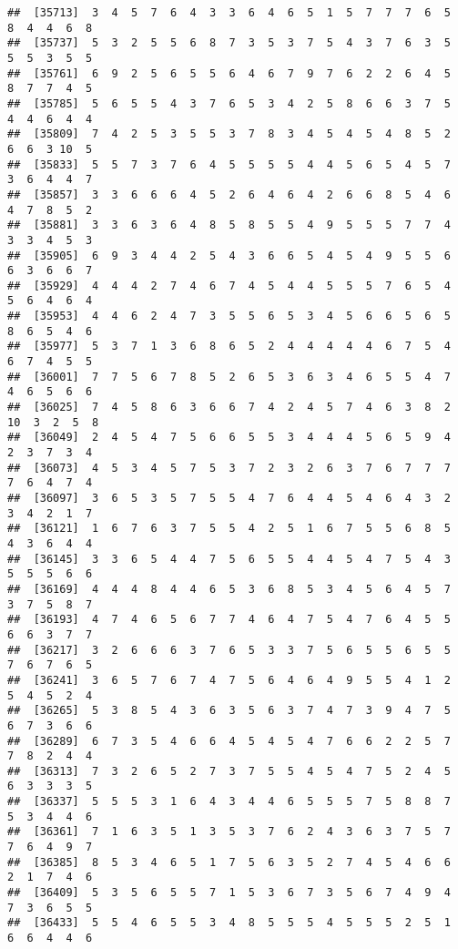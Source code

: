 \documentclass[
]{book}
\begin{document}
\begin{verbatim}
##  [35713]  3  4  5  7  6  4  3  3  6  4  6  5  1  5  7  7  7  6  5  8  4  4  6  8
##  [35737]  5  3  2  5  5  6  8  7  3  5  3  7  5  4  3  7  6  3  5  5  5  3  5  5
##  [35761]  6  9  2  5  6  5  5  6  4  6  7  9  7  6  2  2  6  4  5  8  7  7  4  5
##  [35785]  5  6  5  5  4  3  7  6  5  3  4  2  5  8  6  6  3  7  5  4  4  6  4  4
##  [35809]  7  4  2  5  3  5  5  3  7  8  3  4  5  4  5  4  8  5  2  6  6  3 10  5
##  [35833]  5  5  7  3  7  6  4  5  5  5  5  4  4  5  6  5  4  5  7  3  6  4  4  7
##  [35857]  3  3  6  6  6  4  5  2  6  4  6  4  2  6  6  8  5  4  6  4  7  8  5  2
##  [35881]  3  3  6  3  6  4  8  5  8  5  5  4  9  5  5  5  7  7  4  3  3  4  5  3
##  [35905]  6  9  3  4  4  2  5  4  3  6  6  5  4  5  4  9  5  5  6  6  3  6  6  7
##  [35929]  4  4  4  2  7  4  6  7  4  5  4  4  5  5  5  7  6  5  4  5  6  4  6  4
##  [35953]  4  4  6  2  4  7  3  5  5  6  5  3  4  5  6  6  5  6  5  8  6  5  4  6
##  [35977]  5  3  7  1  3  6  8  6  5  2  4  4  4  4  4  6  7  5  4  6  7  4  5  5
##  [36001]  7  7  5  6  7  8  5  2  6  5  3  6  3  4  6  5  5  4  7  4  6  5  6  6
##  [36025]  7  4  5  8  6  3  6  6  7  4  2  4  5  7  4  6  3  8  2 10  3  2  5  8
##  [36049]  2  4  5  4  7  5  6  6  5  5  3  4  4  4  5  6  5  9  4  2  3  7  3  4
##  [36073]  4  5  3  4  5  7  5  3  7  2  3  2  6  3  7  6  7  7  7  7  6  4  7  4
##  [36097]  3  6  5  3  5  7  5  5  4  7  6  4  4  5  4  6  4  3  2  3  4  2  1  7
##  [36121]  1  6  7  6  3  7  5  5  4  2  5  1  6  7  5  5  6  8  5  4  3  6  4  4
##  [36145]  3  3  6  5  4  4  7  5  6  5  5  4  4  5  4  7  5  4  3  5  5  5  6  6
##  [36169]  4  4  4  8  4  4  6  5  3  6  8  5  3  4  5  6  4  5  7  3  7  5  8  7
##  [36193]  4  7  4  6  5  6  7  7  4  6  4  7  5  4  7  6  4  5  5  6  6  3  7  7
##  [36217]  3  2  6  6  6  3  7  6  5  3  3  7  5  6  5  5  6  5  5  7  6  7  6  5
##  [36241]  3  6  5  7  6  7  4  7  5  6  4  6  4  9  5  5  4  1  2  5  4  5  2  4
##  [36265]  5  3  8  5  4  3  6  3  5  6  3  7  4  7  3  9  4  7  5  6  7  3  6  6
##  [36289]  6  7  3  5  4  6  6  4  5  4  5  4  7  6  6  2  2  5  7  7  8  2  4  4
##  [36313]  7  3  2  6  5  2  7  3  7  5  5  4  5  4  7  5  2  4  5  6  3  3  3  5
##  [36337]  5  5  5  3  1  6  4  3  4  4  6  5  5  5  7  5  8  8  7  5  3  4  4  6
##  [36361]  7  1  6  3  5  1  3  5  3  7  6  2  4  3  6  3  7  5  7  7  6  4  9  7
##  [36385]  8  5  3  4  6  5  1  7  5  6  3  5  2  7  4  5  4  6  6  2  1  7  4  6
##  [36409]  5  3  5  6  5  5  7  1  5  3  6  7  3  5  6  7  4  9  4  7  3  6  5  5
##  [36433]  5  5  4  6  5  5  3  4  8  5  5  5  4  5  5  5  2  5  1  6  6  4  4  6

\end{verbatim}
\end{document}
